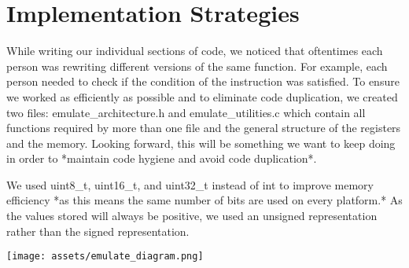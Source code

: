 \documentclass[11pt]{article}
\begin{document}
\section{Implementation Strategies}

While writing our individual sections of code, we noticed that oftentimes each person was rewriting different versions of the same function. For example, each person needed to check if the condition of the instruction was satisfied. To ensure we worked as efficiently as possible and to eliminate code duplication, we created two files: emulate\_architecture.h and emulate\_utilities.c which contain all functions required by more than one file and the general structure of the registers and the memory. Looking forward, this will be something we want to keep doing in order to *maintain code hygiene and avoid code duplication*.

We used uint8\_t, uint16\_t, and uint32\_t instead of int to improve memory efficiency *as this means the same number of bits are used on every platform.* As the values stored will always be positive, we used an unsigned representation rather than the signed representation. 

\texttt{[image: assets/emulate\_diagram.png]}
\end{document}
